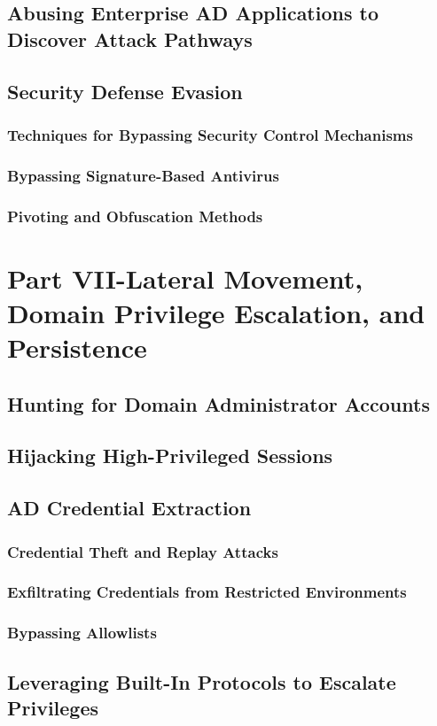 \documentclass{article}
\begin{document}
\subsection{Abusing Enterprise AD Applications to Discover Attack Pathways}
\subsection{Security Defense Evasion}
\subsubsection{Techniques for Bypassing Security Control Mechanisms}
\subsubsection{Bypassing Signature-Based Antivirus}
\subsubsection{Pivoting and Obfuscation Methods}
\section{Part VII-Lateral Movement, Domain Privilege Escalation, and Persistence}
\subsection{Hunting for Domain Administrator Accounts}
\subsection{Hijacking High-Privileged Sessions}
\subsection{AD Credential Extraction}
\subsubsection{Credential Theft and Replay Attacks}
\subsubsection{Exfiltrating Credentials from Restricted Environments}
\subsubsection{Bypassing Allowlists}
\subsection{Leveraging Built-In Protocols to Escalate Privileges}
\end{document}
